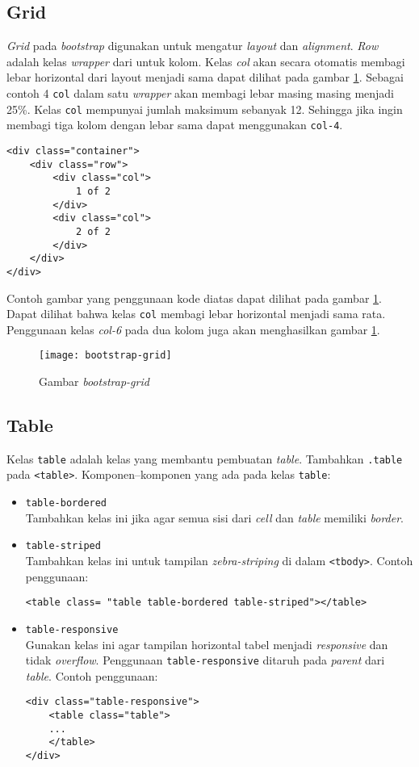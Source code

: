 \subsection{Grid} 
\textit{Grid} pada \textit{bootstrap} digunakan untuk mengatur \textit{layout} dan \textit{alignment}. \textit{Row} adalah kelas \textit{wrapper} dari untuk kolom. Kelas \textit{col} akan secara otomatis membagi lebar horizontal dari layout menjadi sama dapat dilihat pada gambar \ref{fig:bootstrap-grid}. Sebagai contoh 4 \texttt{col} dalam satu \textit{wrapper} akan membagi lebar masing masing menjadi 25\%. Kelas \texttt{col} mempunyai jumlah maksimum sebanyak 12. Sehingga jika ingin membagi tiga kolom dengan lebar sama dapat menggunakan \texttt{col-4}.
\begin{lstlisting}
<div class="container">
	<div class="row">
		<div class="col">
			1 of 2
		</div>
		<div class="col">
			2 of 2
		</div>
	</div>
</div>
\end{lstlisting}
Contoh gambar yang penggunaan kode diatas dapat dilihat pada gambar \ref{fig:bootstrap-grid}. Dapat dilihat bahwa kelas \texttt{col} membagi lebar horizontal menjadi sama rata. Penggunaan kelas \textit{col-6} pada dua kolom juga akan menghasilkan gambar \ref{fig:bootstrap-grid}.
\begin{figure}[H]
	\centering
	\texttt{[image: bootstrap-grid]}  	
	\caption[Gambar bootstrap-grid]{Gambar \textit{bootstrap-grid}}
	\label{fig:bootstrap-grid}  
\end{figure}


\subsection{Table}
Kelas \texttt{table} adalah kelas yang membantu pembuatan \textit{table}. Tambahkan \texttt{.table} pada \texttt{<table>}. Komponen--komponen yang ada pada kelas \texttt{table}:

\begin{itemize}
	\item \texttt{table-bordered} \\
	Tambahkan kelas ini jika agar semua sisi dari \textit{cell} dan \textit{table} memiliki \textit{border}.
	
	\item \texttt{table-striped} \\ 
	Tambahkan kelas ini untuk tampilan \textit{zebra-striping} di dalam \texttt{<tbody>}. Contoh penggunaan:
	\begin{lstlisting}
<table class= "table table-bordered table-striped"></table>
	\end{lstlisting}
	
	\item \texttt{table-responsive} \\ 
	Gunakan kelas ini agar tampilan horizontal tabel menjadi \textit{responsive} dan tidak \textit{overflow}. Penggunaan \texttt{table-responsive} ditaruh pada \textit{parent} dari \textit{table}. Contoh penggunaan:
	\begin{lstlisting}
<div class="table-responsive">
	<table class="table">
	...
	</table>
</div>	
	\end{lstlisting} 
\end{itemize}
